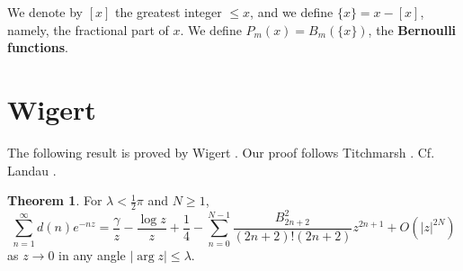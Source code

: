 \documentclass{article}
\theoremstyle{definition}
\newtheorem{theorem}{Theorem}
\begin{document}
We denote by $[x]$ the greatest integer $\leq x$, and we define $\{x\}=x-[x]$, namely, the fractional part of $x$.
We define $P_m(x)=B_m(\{x\})$, the \textbf{Bernoulli functions}.


\section{Wigert}
The following result is proved by Wigert \cite{wigert}. Our proof follows Titchmarsh \cite[p.~163, Theorem 7.15]{zeta}. Cf. Landau \cite{landau}.


\begin{theorem}
For $\lambda<\frac{1}{2}\pi$ and $N \geq 1$,
\[
\sum_{n=1}^\infty d(n) e^{-nz} = \frac{\gamma}{z}-\frac{\log z}{z}+\frac{1}{4}- \sum_{n=0}^{N-1} \frac{B_{2n+2}^2}{(2n+2)!(2n+2)} z^{2n+1}
+O(|z|^{2N})
\]
as $z \to 0$ in any angle $|\arg z| \leq \lambda$.
\label{wigert}
\end{theorem}
\end{document}
